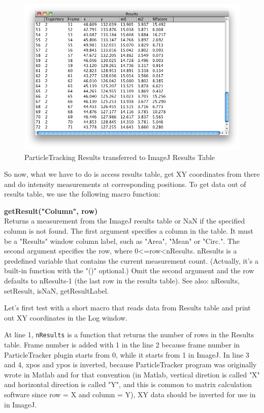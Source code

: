 \documentclass[11pt,a4paper,oneside]{report}
\newenvironment{indentCom}%
{\begin{list}{}%
         {\setlength{\leftmargin}{1em}}%
         \item[]%
}
{\end{list}}
\newcommand{\ilcom}[1]{\texttt{\small#1}}
\begin{document}
\begin{figure}[htbp]
\begin{center}
\includegraphics[scale=0.4]{fig/fig253_TrackingResultsInResultsTabel.png}
\caption{ParticleTracking Results transferred to ImageJ Results Table}
\label{fig:particletrackingTransferred}
\end{center}
\end{figure}

So now, what we have to do is access results table, 
get XY coordinates from there and do intensity measurements at corresponding positions. 
To get data out of results table, we use the following macro function:
\begin{indentCom}
\textbf{getResult("Column", row)}\\
Returns a measurement from the ImageJ results table or NaN if the specified column is not found. 
The first argument specifies a column in the table. 
It must be a "Results" window column label, such as "Area", "Mean" or "Circ.". 
The second argument specifies the row, where 0<=row<nResults. 
nResults is a predefined variable that contains the current measurement count. 
(Actually, it's a built-in function with the "()" optional.) 
Omit the second argument and the row defaults to nResults-1 (the last row in the results table). 
See also: nResults, setResult, isNaN, getResultLabel.
\end{indentCom}
Let's first test with a short macro that reads data from Results table and 
print out XY coordinates in the Log window. 



At line 1, \ilcom{nResults} is a function that returns the number of rows in the Results table. 
Frame number is added with 1 in the line 2  because frame number in ParticleTracker plugin starts from 0, 
while it starts from 1 in ImageJ. 
In line 3 and 4, xpos and ypos is inverted, 
because ParticleTracker program was originally wrote in Matlab and for that convention 
(in Matlab, vertical diretion is called "X" and horizontal direction is called "Y", 
and this is common to matrix calculation software since row = X and column = Y), 
XY data should be inverted for use in in ImageJ. 
\end{document}
